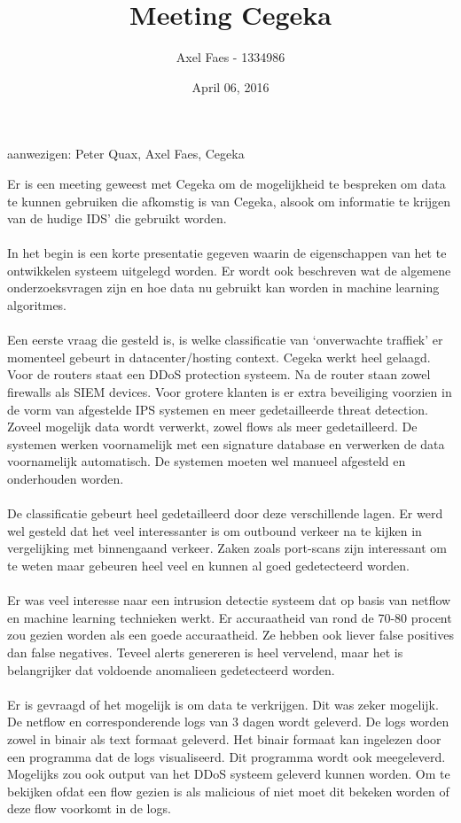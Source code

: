 \documentclass[notitlepage]{article}
\title{Meeting Cegeka}
\author{Axel Faes - 1334986}
\date{April 06, 2016}
\begin{document}
\maketitle

aanwezigen: Peter Quax, Axel Faes, Cegeka

Er is een meeting geweest met Cegeka om de mogelijkheid te bespreken om data te kunnen gebruiken die afkomstig is van Cegeka, alsook om informatie te krijgen van de hudige IDS' die gebruikt worden. \\\\
In het begin is een korte presentatie gegeven waarin de eigenschappen van het te ontwikkelen systeem uitgelegd worden. Er wordt ook beschreven wat de algemene onderzoeksvragen zijn en hoe data nu gebruikt kan worden in machine learning algoritmes. \\\\
Een eerste vraag die gesteld is, is welke classificatie van ‘onverwachte traffiek’ er momenteel gebeurt in datacenter/hosting context. Cegeka werkt heel gelaagd. Voor de routers staat een DDoS protection systeem. Na de router staan zowel firewalls als SIEM devices. Voor grotere klanten is er extra beveiliging voorzien in de vorm van afgestelde IPS systemen en meer gedetailleerde threat detection. Zoveel mogelijk data wordt verwerkt, zowel flows als meer gedetailleerd. De systemen werken voornamelijk met een signature database en verwerken de data voornamelijk automatisch. De systemen moeten wel manueel afgesteld en onderhouden worden. \\\\
De classificatie gebeurt heel gedetailleerd door deze verschillende lagen. Er werd wel gesteld dat het veel interessanter is om outbound verkeer na te kijken in vergelijking met binnengaand verkeer. Zaken zoals port-scans zijn interessant om te weten maar gebeuren heel veel en kunnen al goed gedetecteerd worden. \\\\
Er was veel interesse naar een intrusion detectie systeem dat op basis van netflow en machine learning technieken werkt. Er accuraatheid van rond de 70-80 procent zou gezien worden als een goede accuraatheid. Ze hebben ook liever false positives dan false negatives. Teveel alerts genereren is heel vervelend, maar het is belangrijker dat voldoende anomalieen gedetecteerd worden. \\\\
Er is gevraagd of het mogelijk is om data te verkrijgen. Dit was zeker mogelijk. De netflow en corresponderende logs van 3 dagen wordt geleverd. De logs worden zowel in binair als text formaat geleverd. Het binair formaat kan ingelezen door een programma dat de logs visualiseerd. Dit programma wordt ook meegeleverd. Mogelijks zou ook output van het DDoS systeem geleverd kunnen worden. Om te bekijken ofdat een flow gezien is als malicious of niet moet dit bekeken worden of deze flow voorkomt in de logs.
\end{document}
